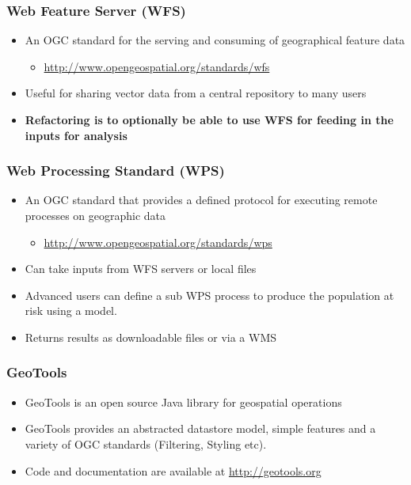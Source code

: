 \documentclass{beamer}
\begin{document}
\begin{frame}[t]
\frametitle{Web Feature Server (WFS)}
\begin{itemize}
  \item An OGC standard for the serving and consuming of geographical feature data 
  \begin{itemize}
    \item \href{http://www.opengeospatial.org/standards/wfs}{http://www.opengeospatial.org/standards/wfs}
  \end{itemize}
  \item Useful for sharing vector data from a central repository to many users
  \item \textbf{Refactoring is to optionally be able to use WFS for feeding in the inputs for analysis}
\end{itemize}
\end{frame}

\begin{frame}[t]
\frametitle{Web Processing Standard (WPS)}
\begin{itemize}
  \item An OGC standard that provides a defined protocol for executing remote processes on geographic data
  \begin{itemize}
    \item \href{http://www.opengeospatial.org/standards/wps}{http://www.opengeospatial.org/standards/wps}
  \end{itemize}
  \item Can take inputs from WFS servers or local files
  \item Advanced users can define a sub WPS process to produce the population at risk using a model.
  \item Returns results as downloadable files or via a WMS
\end{itemize}
\end{frame}

\begin{frame}[t]
\frametitle{GeoTools}
\begin{itemize}
  \item GeoTools is an open source Java library for geospatial operations \citep{Hall2008}
  \item GeoTools provides an abstracted datastore model, simple features and a variety of OGC standards (Filtering, Styling etc).
  \item Code and documentation are available at \url{http://geotools.org}
\end{itemize}
\end{frame}
\end{document}
